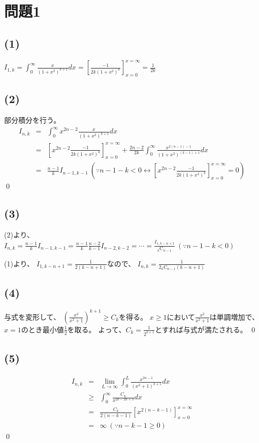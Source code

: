 \documentclass[]{jsarticle}
\begin{document}
\section*{問題1}
    \subsection*{(1)}
        $
            \displaystyle I_{1, k} = \int^\infty_0\frac{x}{(1+x^2)^{k+1}}dx = \left[\frac{-1}{2k(1+x^2)^k}\right]^{x=\infty}_{x=0} = \frac{1}{2k}
        $
    \subsection*{(2)}
        部分積分を行う。
        \begin{eqnarray}
            I_{n, k} &=& \int^\infty_0x^{2n - 2}\frac{x}{(1 + x^2)^{k + 1}}dx \nonumber \\
            &=& \left[x^{2n - 2}\frac{-1}{2k(1 + x ^ 2)^k}\right]^{x=\infty}_{x=0} + \frac{2n-2}{2k}\int^\infty_0\frac{x^{2(n - 1) - 1}}{(1 + x^2)^{(k - 1) + 1}}dx \nonumber \\
            &=& \frac{n - 1}{k}I_{n - 1, k - 1} \ \left(\because n - 1 - k < 0 \leftrightarrow \left[x^{2n - 2}\frac{-1}{2k(1 + x ^ 2)^k}\right]^{x=\infty}_{x=0} = 0 \right) \nonumber
        \end{eqnarray}
        \qed
    \subsection*{(3)}
        (2)より、
        $\displaystyle I_{n, k} = \frac{n - 1}{k}I_{n - 1, k - 1} = \frac{n - 1}{k}\frac{n - 2}{k - 1}I_{n - 2, k - 2} = \cdots = \frac{I_{1, {k - n + 1}}}{{}_k\mathrm C_{n - 1}} \ (\because n - 1 - k < 0)$

        (1)より、
        $\displaystyle I_{1, {k - n + 1}} = \frac{1}{2(k - n + 1)}$なので、
        $\displaystyle I_{n, k} = \frac{1}{2_k\mathrm C_{n - 1}(k - n + 1)}$
    \subsection*{(4)}
        与式を変形して、
        $\displaystyle\left(\frac{x^2}{x^2 + 1}\right)^{k + 1} \geq C_k$を得る。
        $x\geq 1$において$\displaystyle\frac{x^2}{x^2 + 1}$は単調増加で、
        $x = 1$のとき最小値$\displaystyle\frac{1}{2}$を取る。
        よって、$\displaystyle C_k=\frac{1}{2^{k + 1}}$とすれば与式が満たされる。
        \qed
    \subsection*{(5)}
        \begin{eqnarray}
            I_{n, k} &=& \lim_{L\rightarrow\infty}\int^L_0\frac{x^{2n - 1}}{(x^2 + 1)^{k + 1}}dx \nonumber \\
            &\geq& \int^\infty_0\frac{C_k}{x^{2k - 2n + 3}}dx \nonumber \\
            &=& \frac{C_k}{2(n - k - 1)}\left[x^{2(n - k - 1)}\right]^{x = \infty}_{x = 0} \nonumber \\
            &=& \infty \ (\because n - k - 1 \geq 0) \nonumber
        \end{eqnarray}
        \qed
\end{document}
